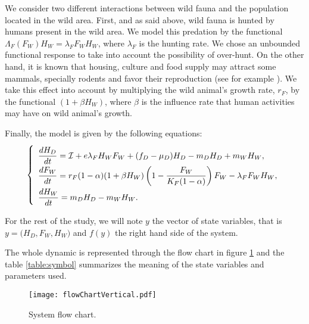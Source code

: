 \documentclass{article}
\newcommand{\lfw}{\lambda_{F}}
\newcommand{\lfw}{\lambda_{F}}
\newcommand{\cI}{\mathcal{I}}
\begin{document}
We consider two different interactions between wild fauna and the population located in the wild area. First, and as said above, wild fauna is hunted by humans present in the wild area. We model this predation by the functional $\Lambda_F(F_W)H_W =  \lfw F_W H_W$, where $\lfw$ is the hunting rate. We chose an unbounded functional response to take into account the possibility of over-hunt. On the other hand, it is known that housing, culture and food supply may attract some mammals, specially rodents and favor their reproduction (see for example \cite{dobigny_zoonotic_2022, dounias_foraging_2011}). We take this effect into account by multiplying the wild animal's growth rate, $r_F$, by the functional $(1 +  \beta H_W)$, where $\beta$ is the influence rate that human activities may have on wild animal's growth.

\medskip
Finally, the model is given by the following equations:
\begin{equation}
\def\arraystretch{2}
\left\{ 
\begin{array}{l}
\dfrac{dH_D}{dt}= \cI + e\lfw H_W F_W + (f_D - \mu_D) H_D - m_D H_D + m_W H_W, \\
\dfrac{dF_W}{dt} = r_F(1- \alpha) (1+ \beta H_W) \left(1 - \dfrac{F_W}{K_F(1-\alpha)} \right) F_W - \lfw F_W H_W,\\
\dfrac{dH_W}{dt}= m_D H_D - m_W H_W.
\end{array} \right.
\label{equation:HDFWHW}
\end{equation}

For the rest of the study, we will note $y$ the vector of state variables, that is $y = \Big(H_D, F_W, H_W \Big)$ and $f(y)$ the right hand side of the system.

The whole dynamic is represented through the flow chart in figure \ref{fig:flow chart} and the table \ref{table:symbol} summarizes the meaning of the state variables and parameters used.

\begin{figure}[!ht]
\centering
\texttt{[image: flowChartVertical.pdf]}
\caption{System flow chart.}
\label{fig:flow chart}
\end{figure}
\end{document}
